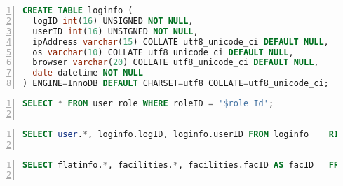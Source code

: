 \begin{lstlisting}[caption={A SQL command for Creating table named logInfo}, label=list:sql, captionpos=b,
           backgroundcolor=\color{white},
           language=SQL,
           breaklines=true,
           frame=single,
           showspaces=false,
           basicstyle=\ttfamily,
           numbers=left,
           numberstyle=\tiny,
           rulecolor=\color{red},
           keywordstyle=\color{blue},
           commentstyle=\color{gray}
           ]
 CREATE TABLE loginfo (
  logID int(16) UNSIGNED NOT NULL,
  userID int(16) UNSIGNED NOT NULL,
  ipAddress varchar(15) COLLATE utf8_unicode_ci DEFAULT NULL,
  os varchar(10) COLLATE utf8_unicode_ci DEFAULT NULL,
  browser varchar(20) COLLATE utf8_unicode_ci DEFAULT NULL,
  date datetime NOT NULL
) ENGINE=InnoDB DEFAULT CHARSET=utf8 COLLATE=utf8_unicode_ci;
\end{lstlisting}


\begin{lstlisting}[caption={A SQL command for Creating table named user-role}, label=list:sql, captionpos=b,
           backgroundcolor=\color{white},
           language=SQL,
           breaklines=true,
           frame=single,
           showspaces=false,
           basicstyle=\ttfamily,
           numbers=left,
           numberstyle=\tiny,
           rulecolor=\color{red},
           keywordstyle=\color{blue},
           commentstyle=\color{gray}
           ]
SELECT * FROM user_role WHERE roleID = '$role_Id';
           
\end{lstlisting}

\begin{lstlisting}[caption={A SQL command for  connecting   logInfo and user }, label=list:sql, captionpos=b,
           backgroundcolor=\color{white},
           language=SQL,
           breaklines=true,
           frame=single,
           showspaces=false,
           basicstyle=\ttfamily,
           numbers=left,
           numberstyle=\tiny,
           rulecolor=\color{red},
           keywordstyle=\color{blue},
           commentstyle=\color{gray}
           ]
 SELECT user.*, loginfo.logID, loginfo.userID FROM loginfo    RIGHT JOIN user on loginfo.userID = user.userID WHERE       loginfo.logID = '$logID' AND loginfo.securityKey='$logKey;
           
\end{lstlisting}

\begin{lstlisting}[caption={A SQL command for  connecting     flatinfo  and facilities }, label=list:sql, captionpos=b,
           backgroundcolor=\color{white},
           language=SQL,
           breaklines=true,
           frame=single,
           showspaces=false,
           basicstyle=\ttfamily,
           numbers=left,
           numberstyle=\tiny,
           rulecolor=\color{red},
           keywordstyle=\color{blue},
           commentstyle=\color{gray}
           ]
 SELECT flatinfo.*, facilities.*, facilities.facID AS facID   FROM flatinfo LEFT JOIN facilities ON flatinfo.facID =      facilities.facID ORDER BY date ASC;
           
\end{lstlisting}

